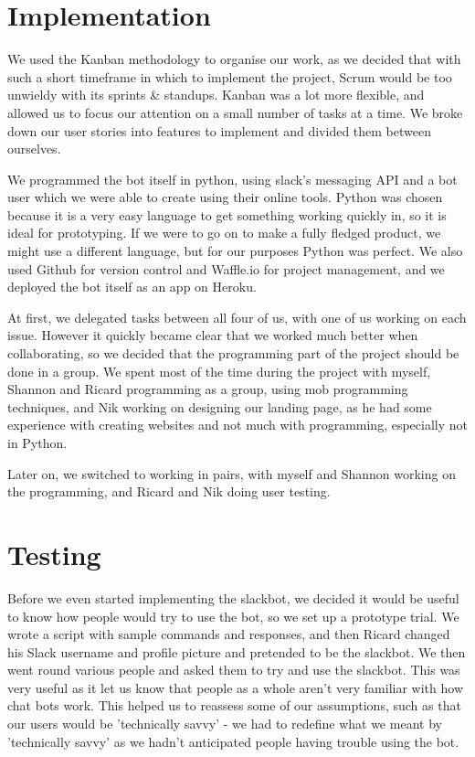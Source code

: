\documentclass[12pt]{report}
\begin{document}
\section{Implementation}\label{implementation}
We used the Kanban methodology to organise our work, as we decided that with such a short timeframe in which to implement the project, Scrum would be too unwieldy with its sprints \& standups. Kanban was a lot more flexible, and allowed us to focus our attention on a small number of tasks at a time. We broke down our user stories into features to implement and divided them between ourselves.

We programmed the bot itself in python, using slack's messaging API and a bot user which we were able to create using their online tools. Python was chosen because it is a very easy language to get something working quickly in, so it is ideal for prototyping. If we were to go on to make a fully fledged product, we might use a different language, but for our purposes Python was perfect. We also used Github for version control and Waffle.io for project management, and we deployed the bot itself as an app on Heroku.

At first, we delegated tasks between all four of us, with one of us working on each issue. However it quickly became clear that we worked much better when collaborating, so we decided that the programming part of the project should be done in a group. We spent most of the time during the project with myself, Shannon and Ricard programming as a group, using mob programming techniques, and Nik working on designing our landing page, as he had some experience with creating websites and not much with programming, especially not in Python.

Later on, we switched to working in pairs, with myself and Shannon working on the programming, and Ricard and Nik doing user testing.

\section{Testing}\label{testing}
Before we even started implementing the slackbot, we decided it would be useful to know how people would try to use the bot, so we set up a prototype trial. We wrote a script with sample commands and responses, and then Ricard changed his Slack username and profile picture and pretended to be the slackbot. We then went round various people and asked them to try and use the slackbot. This was very useful as it let us know that people as a whole aren't very familiar with how chat bots work. This helped us to reassess some of our assumptions, such as that our users would be 'technically savvy' - we had to redefine what we meant by 'technically savvy' as we hadn't anticipated people having trouble using the bot.
\end{document}
